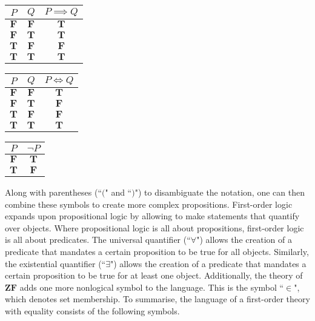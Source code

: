 \documentclass[../main.tex]{subfiles}
\begin{document}
\begin{table}[!hbp]
    \begin{minipage}{.5\linewidth}
        \centering
        \begin{tabular}{c|c||c}
            $P$ & $Q$ & $P\implies Q$ \\
            \hline
            $\mathbf{F}$ & $\mathbf{F}$ & $\mathbf{T}$ \\
            $\mathbf{F}$ & $\mathbf{T}$ & $\mathbf{T}$ \\
            $\mathbf{T}$ & $\mathbf{F}$ & $\mathbf{F}$ \\
            $\mathbf{T}$ & $\mathbf{T}$ & $\mathbf{T}$
        \end{tabular}
        \label{tab:first_order_logic:logical_implication}
    \end{minipage}%
    \begin{minipage}{.5\linewidth}
        \centering
        \begin{tabular}{c|c||c}
            $P$ & $Q$ & $P\iff Q$ \\
            \hline
            $\mathbf{F}$ & $\mathbf{F}$ & $\mathbf{T}$ \\
            $\mathbf{F}$ & $\mathbf{T}$ & $\mathbf{F}$ \\
            $\mathbf{T}$ & $\mathbf{F}$ & $\mathbf{F}$ \\
            $\mathbf{T}$ & $\mathbf{T}$ & $\mathbf{T}$
        \end{tabular}
        \label{tab:first_order_logic:logical_biconditional}
    \end{minipage}

    \begin{center}
        \begin{tabular}{c||c}
            $P$ & $\lnot P$ \\
            \hline
            $\mathbf{F}$ & $\mathbf{T}$ \\
            $\mathbf{T}$ & $\mathbf{F}$
        \end{tabular}
        \label{tab:first_order_logic:logical_negation}
    \end{center}
\end{table}
Along with parentheses (``$($" and ``$)$") to disambiguate the notation, one can then combine these symbols to create more complex propositions. First-order logic expands upon propositional logic by allowing to make statements that quantify over objects. Where propositional logic is all about propositions, first-order logic is all about predicates. The universal quantifier (``$\forall$") allows the creation of a predicate that mandates a certain proposition to be true for all objects. Similarly, the existential quantifier (``$\exists$") allows the creation of a predicate that mandates a certain proposition to be true for at least one object. Additionally, the theory of $\mathbf{ZF}$ adds one more nonlogical symbol to the language. This is the symbol ``$\in$", which denotes set membership. To summarise, the language of a first-order theory with equality consists of the following symbols.
\end{document}
